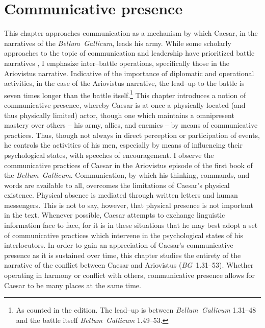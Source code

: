 \documentclass[12pt,letterpaper,oneside,final]{memoir}
\begin{document}
\chapter{Communicative presence}%
\label{ch-pres}
This chapter approaches communication as a mechanism by which Caesar, in the narratives of the \emph{Bellum~Gallicum}, leads his army. While some scholarly approaches to the topic of communication and leadership have prioritized battle narratives \parencite{lendon1999,kagan2006}, I emphasize inter--battle operations, specifically those in the Ariovistus narrative. Indicative of the importance of diplomatic and operational activities, in the case of the Ariovistus narrative, the lead--up to the battle is seven times longer than the battle itself.\footnote{As counted in the \textcite{hering2008} edition. The lead--up is between \emph{Bellum~Gallicum} 1.31--48 and the battle itself \emph{Bellum~Gallicum} 1.49--53.} This chapter introduces a notion of communicative presence, whereby Caesar is at once a physically located (and thus physically limited) actor, though one which maintains a omnipresent mastery over others -- his army, allies, and enemies -- by means of communicative practices. Thus, though not always in direct perception or participation of events, he controls the activities of his men, especially by means of influencing their psychological states, with speeches of encouragement. I observe the communicative practices of Caesar in the Ariovistus episode of the first book of the \emph{Bellum~Gallicum}. Communication, by which his thinking, commands, and words are available to all, overcomes the limitations of Caesar's physical existence. Physical absence is mediated through written letters and human messengers. This is not to say, however, that physical presence is not important in the text. Whenever possible, Caesar attempts to exchange linguistic information face to face, for it is in these situations that he may best adopt a set of communicative practices which intervene in the psychological states of his interlocutors. In order to gain an appreciation of Caesar's communicative presence as it is sustained over time, this chapter studies the entirety of the narrative of the conflict between Caesar and Ariovistus (\emph{BG}~1.31--53). Whether operating in harmony or conflict with others, communicative presence allows for Caesar to be many places at the same time.
\end{document}
